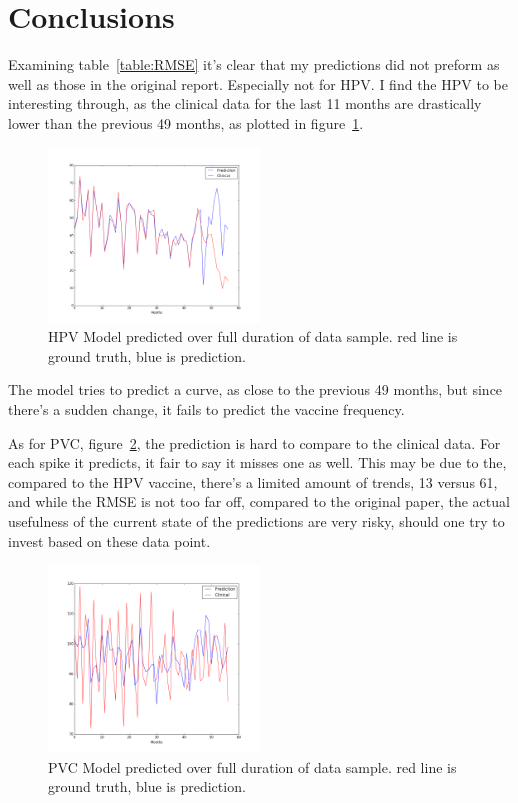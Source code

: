 \documentclass{sig-alternate}
\begin{document}
\section{Conclusions}
Examining table~\ref{table:RMSE} it's clear that my predictions did not preform as well as those in the original report. 
Especially not for HPV. I find the HPV to be interesting through, as the clinical data for the last 11 months are drastically lower than the previous 49 months, as plotted in figure~\ref{fig:HPV_FULL}.
\begin{figure}[h!]
\centering
\includegraphics[width=0.5\textwidth]{hpv_full_prediction}
\caption{HPV Model predicted over full duration of data sample. red line is ground truth, blue is prediction.}
\label{fig:HPV_FULL}
\end{figure}
The model tries to predict a curve, as close to the previous 49 months, but since there's a sudden change, it fails to predict the vaccine frequency.

As for PVC, figure~\ref{fig:PVC_FULL}, the prediction is hard to compare to the clinical data. For each spike it predicts, it fair to say it misses one as well. This may be due to the, compared to the HPV vaccine, there's a limited amount of trends, 13 versus 61, and while the RMSE is not too far off, compared to the original paper, the actual usefulness of the current state of the predictions are very risky, should one try to invest based on these data point.
\begin{figure}[h!]
\centering
\includegraphics[width=0.5\textwidth]{pvc_full_prediction}
\caption{PVC Model predicted over full duration of data sample. red line is ground truth, blue is prediction.}
\label{fig:PVC_FULL}
\end{figure}
\end{document}
